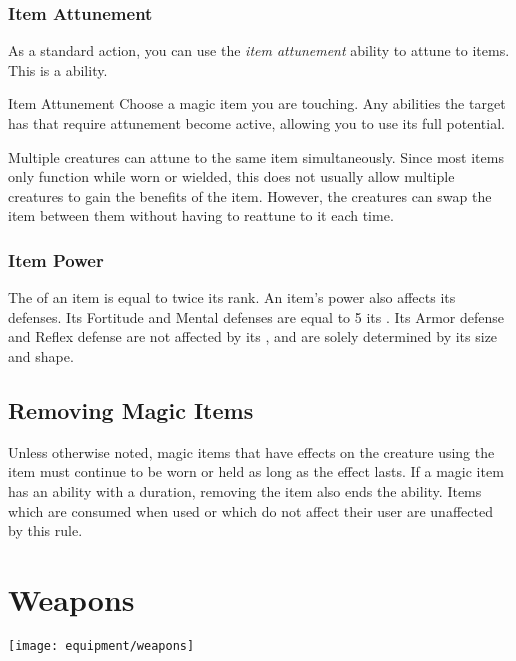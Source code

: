         \subsubsection{Item Attunement}\label{Item Attunement}

            As a standard action, you can use the \textit{item attunement} ability to attune to items.
            This is a  ability.

            \begin{attuneability}{Item Attunement}{}
                \rankline
                Choose a magic item you are touching.
                Any abilities the target has that require attunement become active, allowing you to use its full potential.
            \end{attuneability}

             Multiple creatures can attune to the same item simultaneously.
            Since most items only function while worn or wielded, this does not usually allow multiple creatures to gain the benefits of the item.
            However, the creatures can swap the item between them without having to reattune to it each time.

    \subsubsection{Item Power}\label{Item Power}
        The  of an item is equal to twice its rank.
        An item's power also affects its defenses.
        Its Fortitude and Mental defenses are equal to 5 \add its .
        Its Armor defense and Reflex defense are not affected by its , and are solely determined by its size and shape.

    \subsection{Removing Magic Items}
        Unless otherwise noted, magic items that have effects on the creature using the item must continue to be worn or held as long as the effect lasts.
        If a magic item has an ability with a duration, removing the item also ends the ability.
        Items which are consumed when used or which do not affect their user are unaffected by this rule.

\newpage
\section{Weapons}\label{Weapons}
    \texttt{[image: equipment/weapons]}

